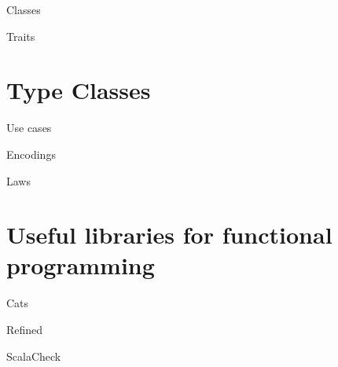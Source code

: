 \documentclass[10pt]{beamer}
\begin{document}
  \begin{frame}{Classes}
  \end{frame}

  \begin{frame}{Traits}
  \end{frame}

  \section{Type Classes}
  \begin{frame}{Use cases}
  \end{frame}

  \begin{frame}{Encodings}
  \end{frame}

  \begin{frame}{Laws}
  \end{frame}

  \section{Useful libraries for functional programming}
  \begin{frame}{Cats}
  \end{frame}

  \begin{frame}{Refined}
  \end{frame}

  \begin{frame}{ScalaCheck}
  \end{frame}
\end{document}
